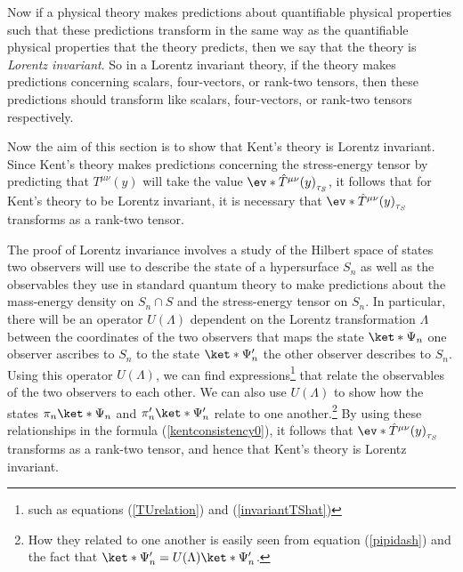 \documentclass[12pt]{report}
\begin{document}
Now if a physical theory makes predictions about quantifiable physical properties such that these predictions transform in the same way as the quantifiable physical properties that the theory predicts, then we say that the theory is \emph{Lorentz invariant}. So in a Lorentz invariant theory, if the theory makes predictions concerning scalars, four-vectors, or rank-two tensors,  then these predictions should transform like scalars, four-vectors, or rank-two tensors respectively. 

Now the aim of this section is to show that Kent's theory is Lorentz invariant. Since Kent's theory makes predictions concerning the stress-energy tensor by predicting that ${T^{\mu\nu}(y)}$ will take the value $\ev*{\hat{T}^{\mu\nu}(y)}_{\tau_S}$, it follows that for Kent's theory to be Lorentz invariant, it is necessary that  $\ev*{\hat{T}^{\mu\nu}(y)}_{\tau_S}$ transforms as a rank-two tensor. 

The proof of Lorentz invariance involves a study of the Hilbert space of states two observers will use to describe the state of a hypersurface $S_n$ as well as the observables they use in standard quantum theory to make predictions about the mass-energy density on  $S_n\cap S$ and the stress-energy tensor on $S_n$. In particular, there will be an operator $U(\Lambda)$ dependent on the Lorentz transformation $\Lambda$ between the coordinates of the two observers that maps the state $\ket*{\Psi_n}$ one observer ascribes to $S_n$ to the state $\ket*{\Psi_n'}$ the other observer describes to $S_n$. Using this operator $U(\Lambda)$, we can find expressions\footnote{such as equations (\ref{TUrelation}) and (\ref{invariantTShat})} that relate the observables of the two observers to each other. We can also use $U(\Lambda)$ to show how the states $\pi_n\ket*{\Psi_n}$ and $\pi_n'\ket*{\Psi_n'}$ relate to one another.\footnote{How they related to one another is easily seen from equation (\ref{pipidash}) and the fact that $\ket*{\Psi_n'}=U(\Lambda)\ket*{\Psi_n'}$.} By using these relationships in the formula (\ref{kentconsistency0}), it follows that $\ev*{\hat{T}^{\mu\nu}(y)}_{\tau_S}$ transforms as a rank-two tensor, and hence that Kent's theory is Lorentz invariant.
\end{document}
